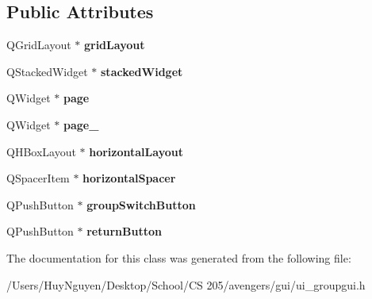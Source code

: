 \subsection*{Public Attributes}
\begin{DoxyCompactItemize}
\item 
Q\+Grid\+Layout $\ast$ {\bfseries grid\+Layout}\hypertarget{classUi__GroupGUI_aa5d31ce2d229d180b9acf06071a4ee2a}{}\label{classUi__GroupGUI_aa5d31ce2d229d180b9acf06071a4ee2a}

\item 
Q\+Stacked\+Widget $\ast$ {\bfseries stacked\+Widget}\hypertarget{classUi__GroupGUI_a7d29bc5ee8630901c0d422366b506774}{}\label{classUi__GroupGUI_a7d29bc5ee8630901c0d422366b506774}

\item 
Q\+Widget $\ast$ {\bfseries page}\hypertarget{classUi__GroupGUI_a492579f93ca659325857087cc30f746c}{}\label{classUi__GroupGUI_a492579f93ca659325857087cc30f746c}

\item 
Q\+Widget $\ast$ {\bfseries page\+\_}\hypertarget{classUi__GroupGUI_a6ce0ef9c89dcf3d4e6751c90d756cf68}{}\label{classUi__GroupGUI_a6ce0ef9c89dcf3d4e6751c90d756cf68}

\item 
Q\+H\+Box\+Layout $\ast$ {\bfseries horizontal\+Layout}\hypertarget{classUi__GroupGUI_aaa24020deaba8b069bdb453d435667d1}{}\label{classUi__GroupGUI_aaa24020deaba8b069bdb453d435667d1}

\item 
Q\+Spacer\+Item $\ast$ {\bfseries horizontal\+Spacer}\hypertarget{classUi__GroupGUI_a964765bf18e4b1c3cdad18a4501be53d}{}\label{classUi__GroupGUI_a964765bf18e4b1c3cdad18a4501be53d}

\item 
Q\+Push\+Button $\ast$ {\bfseries group\+Switch\+Button}\hypertarget{classUi__GroupGUI_ad6e345cddbbe8697b4d5374bee943b46}{}\label{classUi__GroupGUI_ad6e345cddbbe8697b4d5374bee943b46}

\item 
Q\+Push\+Button $\ast$ {\bfseries return\+Button}\hypertarget{classUi__GroupGUI_a9f92e279b74c28a28fcad6c5094c20ec}{}\label{classUi__GroupGUI_a9f92e279b74c28a28fcad6c5094c20ec}

\end{DoxyCompactItemize}


The documentation for this class was generated from the following file\+:\begin{DoxyCompactItemize}
\item 
/\+Users/\+Huy\+Nguyen/\+Desktop/\+School/\+C\+S 205/avengers/gui/ui\+\_\+groupgui.\+h\end{DoxyCompactItemize}
